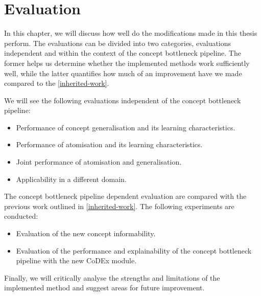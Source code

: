 \chapter{Evaluation}


% 
% 
% 
% 
% 
% 
% 
%     
%  
% 
% 


In this chapter, we will discuss how well do the modifications made in this thesis perform. 
The evaluations can be divided into two categories, evaluations independent and within the context of the concept bottleneck pipeline.
The former helps us determine whether the implemented methods work sufficiently well, while the latter quantifies how much of an improvement have we made compared to the \ref{inherited-work}.

We will see the following evaluations independent of the concept bottleneck pipeline:
\begin{itemize}
    \item Performance of concept generalisation and its learning characteristics.
    \item Performance of atomisation and its learning characteristics.
    \item Joint performance of atomisation and generalisation.
    \item Applicability in a different domain.
\end{itemize}

The concept bottleneck pipeline dependent evaluation are compared with the previous work outlined in \ref{inherited-work}.
The following experiments are conducted:
\begin{itemize}
    \item Evaluation of the new concept informability.
    \item Evaluation of the performance and explainability of the concept bottleneck pipeline with the new CoDEx module.
\end{itemize}
Finally, we will critically analyse the strengths and limitations of the implemented method and suggest areas for future improvement.

